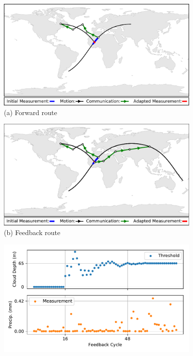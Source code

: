 \documentclass[conference]{IEEEtran}
\begin{document}
\begin{figure}[b!]
  \begin{minipage}[b]{\linewidth}
    \begin{center}
      \includegraphics[width=0.9\textwidth]{images/half_loop.png} \\
      {\footnotesize(a) Forward route}
    \end{center}
    \medskip
  \end{minipage}
  \begin{minipage}[b]{\linewidth}
    \begin{center}
      \includegraphics[width=0.9\textwidth]{images/loop.pdf} \\
      {\footnotesize(b) Feedback route}
    \end{center}
  \end{minipage}
  \begin{minipage}[b]{\linewidth}
    \begin{center}
      \includegraphics[width=0.9\textwidth]{images/regression.pdf} \\

\end{center}
\end{minipage}
\end{figure}
\end{document}
